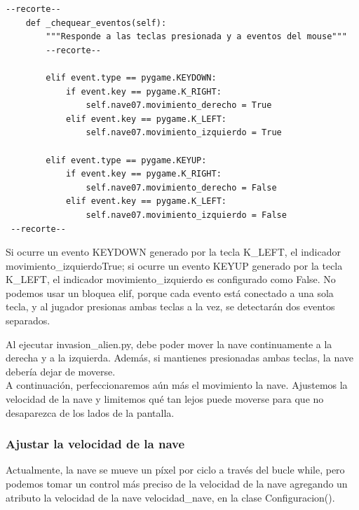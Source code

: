 \hspace{-2.4cm}{\ttfamily \scriptsize invasión}

\vspace{-0.2cm}
\hspace{-2.1cm}{\ttfamily \scriptsize \_alien.py}\vspace{-0.84cm}
\begin{lstlisting}
--recorte--		
    def _chequear_eventos(self):
        """Responde a las teclas presionada y a eventos del mouse"""
        --recorte-- 
        
        elif event.type == pygame.KEYDOWN:
            if event.key == pygame.K_RIGHT:
                self.nave07.movimiento_derecho = True
            elif event.key == pygame.K_LEFT:
                self.nave07.movimiento_izquierdo = True

        elif event.type == pygame.KEYUP:
            if event.key == pygame.K_RIGHT:
                self.nave07.movimiento_derecho = False
            elif event.key == pygame.K_LEFT:               
                self.nave07.movimiento_izquierdo = False
 --recorte--                
\end{lstlisting}

Si ocurre un evento {\ttfamily KEYDOWN} generado por la tecla {\ttfamily K\_LEFT}, el indicador  {\ttfamily movimiento\_izquierdo}{\ttfamily True}; si  ocurre  un evento {\ttfamily KEYUP}  generado por la tecla {\ttfamily K\_LEFT}, el indicador  {\ttfamily movimiento\_izquierdo}  es configurado como {\ttfamily False}.  No podemos usar un bloquea  {\ttfamily elif},  porque cada evento está conectado a una sola tecla, y al jugador presionas ambas teclas a la vez, se detectarán dos eventos separados.


Al  ejecutar {\ttfamily invasion\_alien.py}, debe poder mover la nave continuamente a la derecha y a la izquierda. 
Además, si mantienes presionadas ambas teclas, la nave debería dejar de moverse.\\

A continuación, perfeccionaremos aún más el movimiento la nave. Ajustemos la velocidad de la nave y limitemos qué tan
lejos puede moverse para que no desaparezca de los lados de la pantalla.


\subsubsection{Ajustar la velocidad de la nave}

Actualmente, la nave se mueve un píxel por ciclo a través del bucle while, pero podemos tomar un control más preciso de
la velocidad de la nave agregando un atributo  la velocidad de la nave {\ttfamily velocidad\_nave}, en la  clase {\ttfamily Configuracion()}. 

